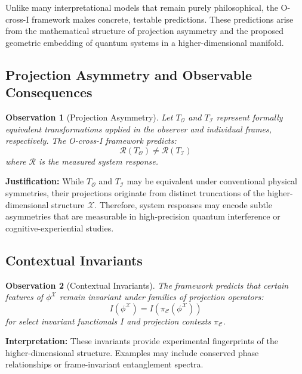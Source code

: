\documentclass{article}
\newtheorem{observation}{Observation}
\begin{document}
Unlike many interpretational models that remain purely philosophical, the O-cross-I framework makes concrete, testable predictions. These predictions arise from the mathematical structure of projection asymmetry and the proposed geometric embedding of quantum systems in a higher-dimensional manifold.

\subsection{Projection Asymmetry and Observable Consequences}

\begin{observation}[Projection Asymmetry]
Let $T_{\mathcal{O}}$ and $T_{\mathcal{I}}$ represent formally equivalent transformations applied in the observer and individual frames, respectively. The O-cross-I framework predicts:
\begin{equation}
\mathcal{R}(T_{\mathcal{O}}) \neq \mathcal{R}(T_{\mathcal{I}})
\end{equation}
where $\mathcal{R}$ is the measured system response.
\end{observation}

\noindent
\textbf{Justification:} While $T_{\mathcal{O}}$ and $T_{\mathcal{I}}$ may be equivalent under conventional physical symmetries, their projections originate from distinct truncations of the higher-dimensional structure $\mathcal{X}$. Therefore, system responses may encode subtle asymmetries that are measurable in high-precision quantum interference or cognitive-experiential studies.

\subsection{Contextual Invariants}

\begin{observation}[Contextual Invariants]
The framework predicts that certain features of $\phi^{\mathcal{X}}$ remain invariant under families of projection operators:
\begin{equation}
I(\phi^{\mathcal{X}}) = I(\pi_{\mathcal{C}}(\phi^{\mathcal{X}}))
\end{equation}
for select invariant functionals $I$ and projection contexts $\pi_{\mathcal{C}}$.
\end{observation}

\noindent
\textbf{Interpretation:} These invariants provide experimental fingerprints of the higher-dimensional structure. Examples may include conserved phase relationships or frame-invariant entanglement spectra. 
\end{document}
